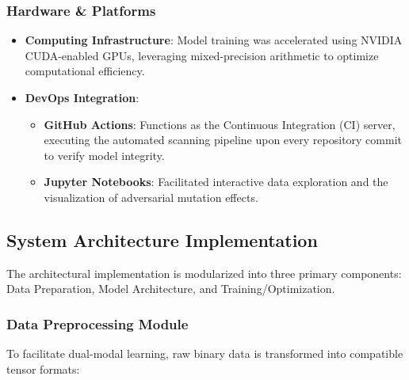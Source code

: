 \subsubsection{Hardware \& Platforms}
\begin{itemize}
    \item \textbf{Computing Infrastructure}: Model training was accelerated using NVIDIA CUDA-enabled GPUs, leveraging mixed-precision arithmetic to optimize computational efficiency.
    \item \textbf{DevOps Integration}:
    \begin{itemize}
        \item \textbf{GitHub Actions}: Functions as the Continuous Integration (CI) server, executing the automated scanning pipeline upon every repository commit to verify model integrity.
        \item \textbf{Jupyter Notebooks}: Facilitated interactive data exploration and the visualization of adversarial mutation effects.
    \end{itemize}
\end{itemize}

\subsection{System Architecture Implementation}
The architectural implementation is modularized into three primary components: Data Preparation, Model Architecture, and Training/Optimization.

\subsubsection{Data Preprocessing Module}
To facilitate dual-modal learning, raw binary data is transformed into compatible tensor formats:

